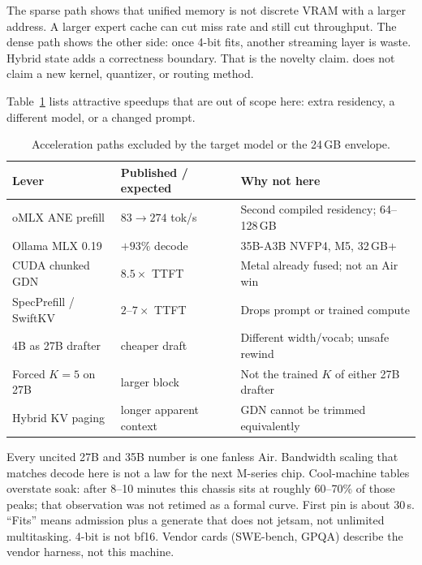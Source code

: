 The sparse path shows that unified memory is not discrete VRAM with a larger address. A larger expert cache can cut miss rate and still cut throughput. The dense path shows the other side: once 4-bit fits, another streaming layer is waste. Hybrid state adds a correctness boundary. That is the novelty claim. \slotbank{} does not claim a new kernel, quantizer, or routing method.

Table~\ref{tab:reject} lists attractive speedups that are out of scope here: extra residency, a different model, or a changed prompt.

\begin{table}[t]
\centering
\caption{Acceleration paths excluded by the target model or the 24\,GB envelope.}
\label{tab:reject}
\scriptsize
\begin{tabular}{@{}p{3.4cm}p{4.2cm}p{5.6cm}@{}}
\toprule
Lever & Published / expected & Why not here \\
\midrule
oMLX ANE prefill & $83{\to}274$ tok/s~\citep{weschera2026} & Second compiled residency; 64--128\,GB \\
Ollama MLX 0.19 & ${+}93\%$ decode~\citep{ollama019} & 35B-A3B NVFP4, M5, 32\,GB+ \\
CUDA chunked GDN & $8.5{\times}$ TTFT~\citep{mlxvlm1423} & Metal already fused; not an Air win \\
SpecPrefill / SwiftKV & $2$--$7{\times}$ TTFT~\citep{yuan2024specprefill,swiftkv} & Drops prompt or trained compute \\
4B as 27B drafter & cheaper draft & Different width/vocab; unsafe rewind \\
Forced $K{=}5$ on 27B & larger block & Not the trained $K$ of either 27B drafter \\
Hybrid KV paging & longer apparent context & GDN cannot be trimmed equivalently \\
\bottomrule
\end{tabular}
\end{table}

Every uncited 27B and 35B number is one fanless Air. Bandwidth scaling that matches decode here is not a law for the next M-series chip. Cool-machine tables overstate soak: after 8--10 minutes this chassis sits at roughly 60--70\% of those peaks; that observation was not retimed as a formal curve. First pin is about 30\,s. ``Fits'' means admission plus a generate that does not jetsam, not unlimited multitasking. 4-bit is not bf16. Vendor cards (SWE-bench, GPQA) describe the vendor harness, not this machine.


